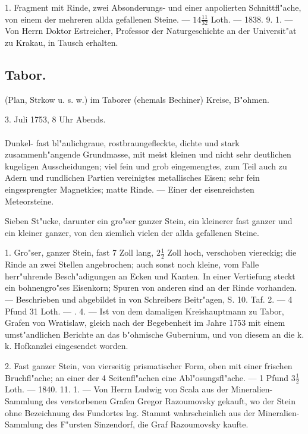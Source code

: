 \documentclass[a4paper, 11pt, oneside, polutonikogreek, german]{article}
\begin{document}
1. Fragment mit Rinde, zwei Absonderungs- und einer anpolierten Schnittfl"ache, von einem der mehreren allda gefallenen Steine. --- $14\frac{11}{32}$ Loth. --- 1838. 9. 1. --- Von Herrn Doktor Estreicher, Professor der Naturgeschichte an der Universit"at zu Krakau, in Tausch erhalten.
\subsection{Tabor.}
\begin{center}
\small
(Plan, Strkow u. s. w.) im Taborer (ehemals Bechiner) Kreise, B"ohmen.

3. Juli 1753, 8 Uhr Abends.
\end{center}
\paragraph{}
Dunkel- fast bl"aulichgraue, rostbraungefleckte, dichte und stark zusammenh"angende Grundmasse, mit meist kleinen und nicht sehr deutlichen kugeligen Ausscheidungen; viel fein und grob eingemengtes, zum Teil auch zu Adern und rundlichen Partien vereinigtes metallisches Eisen; sehr fein eingesprengter Magnetkies; matte Rinde. --- Einer der eisenreichsten Meteorsteine.

Sieben St"ucke, darunter ein gro"ser ganzer Stein, ein kleinerer fast ganzer und ein kleiner ganzer, von den ziemlich vielen der allda gefallenen Steine.

1. Gro"ser, ganzer Stein, fast 7 Zoll lang, $2\frac{1}{2}$ Zoll hoch, verschoben viereckig; die Rinde an zwei Stellen angebrochen; auch sonst noch kleine, vom Falle herr"uhrende Besch"adigungen an Ecken und Kanten. In einer Vertiefung steckt ein bohnengro"ses Eisenkorn; Spuren von anderen sind an der Rinde vorhanden. --- Beschrieben und abgebildet in von Schreibers Beitr"agen, S. 10. Taf. 2. --- 4 Pfund 31 Loth. --- . 4. --- Ist von dem damaligen Kreishauptmann zu Tabor, Grafen von Wratislaw, gleich nach der Begebenheit im Jahre 1753 mit einem umst"andlichen Berichte an das b"ohmische Gubernium, und von diesem an die k. k. Hofkanzlei eingesendet worden.

2. Fast ganzer Stein, von vierseitig prismatischer Form, oben mit einer frischen Bruchfl"ache; an einer der 4 Seitenfl"achen eine Abl"osungsfl"ache. --- 1 Pfund $3\frac{1}{2}$ Loth. --- 1840. 11. 1. --- Von Herrn Ludwig von Scala aus der Mineralien-Sammlung des verstorbenen Grafen Gregor Razoumovsky gekauft, wo der Stein ohne Bezeichnung des Fundortes lag. Stammt wahrscheinlich aus der Mineralien-Sammlung des F"ursten Sinzendorf, die Graf Razoumovsky kaufte.
\end{document}
